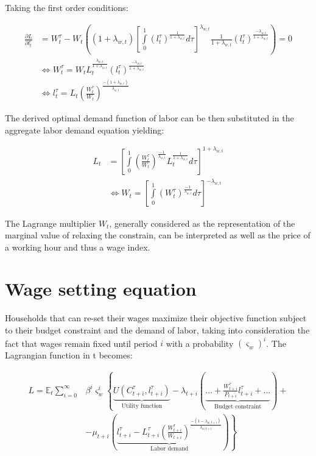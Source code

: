 \documentclass{pracamgr}
\numberwithin{equation}{section}
\begin{document}
Taking the first order conditions:

\begin{align} \label{Optimal demand function for labor}
\frac{\partial L}{\partial l_{t}^{\tau}} &= W_{t}^{\tau} - W_{t} \left( \left( 1+\lambda_{w ,t} \right) \left[  \int\limits_{0}^{1} \left( l_{t}^{\tau} \right)^{\frac{1}{1+\lambda_{w ,t}}} d\tau \right]^{\lambda_{w ,t}} \frac{1}{1+\lambda_{w ,t}}  \left( l_{t}^{\tau} \right)^{\frac{-\lambda_{w ,t}}{1+\lambda_{w ,t}}} \right) = 0 \nonumber \\
& \iff W_{t}^{\tau} = W_{t} L_{t}^{\frac{\lambda_{w ,t}}{1+\lambda_{w,t}}} \left( l_{t}^{\tau} \right)^{\frac{-\lambda_{w,t}}{1+\lambda_{w ,t}}} \nonumber \\
& \iff l_{t}^{\tau}= L_{t} \left( \frac{W_{t}^{\tau}}{W_{t}}\right)^{\frac{-(1+\lambda_{w,t})}{\lambda_{w ,t}}}
\end{align} 

The derived optimal demand function of labor can be then substituted in the aggregate labor demand equation yielding:

\begin{align}
L_{t} &= \left[ \int\limits_{0}^{1} \left( \frac{W_{t}^{\tau}}{W_{t}}\right)^{\frac{-1}{\lambda_{w ,t}}} L_{t}^{\frac{1}{1+\lambda_{w ,t}}} d\tau \right]^{1+\lambda_{w,t}} \nonumber \\
& \iff W_{t} = \left[ \int\limits_{0}^{1} \left( W_{t}^{\tau} \right)^{\frac{-1}{\lambda_{w ,t}}}  d\tau \right]^{-\lambda_{w,t}}
\end{align}

The Lagrange multiplier $W_{t}$, generally considered as the representation of the marginal value of relaxing the constrain, can be interpreted as well as the price of a working hour and thus a wage index.

\section*{Wage setting equation}

Households that can re-set their wages maximize their objective function subject to their budget constraint and the demand of labor, taking into consideration the fact that wages remain fixed until period $i$ with a probability $\left( \varsigma_{w} \right)^{i}$. The Lagrangian function in t becomes:

\begin{align}
L = \mathbb{E}_{t} \sum\limits_{i=0}^{\infty} &\beta^{i} \varsigma_{w}^{i} \left\{\underbrace{U \left(C_{t+i}^{\tau}, l_{t+i}^{\tau} \right)}_\text{Utility function} - \lambda_{t+i} \left( \underbrace{\ldots + \frac{W_{t+i}^{\tau}}{P_{t+i}} l_{t+i}^{\tau} + \ldots }_\text{Budget constraint} \right) + \nonumber \right. \\ 
& \left. - \mu_{t+i} \left( \underbrace{l_{t+i}^{\tau} - L_{t+i}^{\tau} \left(\frac{W_{t+i}^{\tau}}{W_{t+i}} \right)^{\frac{-\left(1-\lambda_{w, t+i}\right)}{\lambda_{w, t+i}}}}_\text{Labor demand} \right) \right\}
\end{align}
\end{document}
